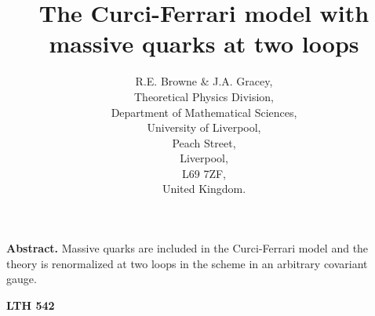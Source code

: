 \documentclass[a4paper,11pt]{article}
\providecommand{\MSbar}{\overline{\mbox{MS}}}
\begin{document}
\title{The Curci-Ferrari model with massive quarks at two loops} 
\author{R.E. Browne \& J.A. Gracey, \\ Theoretical Physics Division, \\ 
Department of Mathematical Sciences, \\ University of Liverpool, \\ Peach 
Street, \\ Liverpool, \\ L69 7ZF, \\ United Kingdom.} 
\date{} 
\maketitle 
\vspace{5cm} 
\noindent 
{\bf Abstract.} Massive quarks are included in the Curci-Ferrari model and the
theory is renormalized at two loops in the \myHighlight{$\MSbar$}\coordHE{} scheme in an arbitrary
covariant gauge.  

\vspace{-14cm} 
\hspace{13.5cm} 
{\bf LTH 542} 

\newpage 
\end{document}
